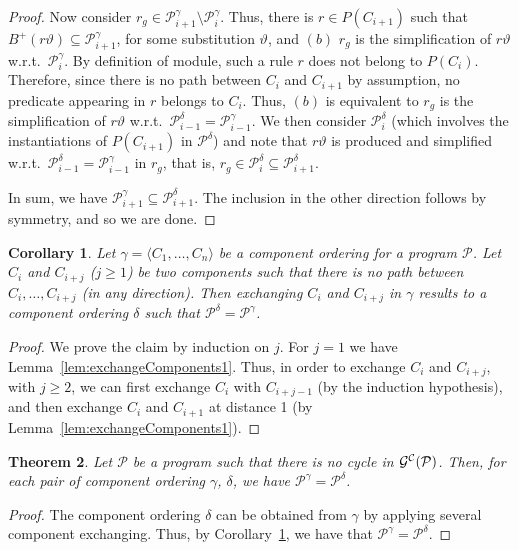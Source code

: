 \documentclass{tlp}
\newcommand{\p}{\ensuremath{{\mathcal{P}}}}
\newcommand{\intelligent}{\ensuremath{\p}}
\newcommand{\R}{\ensuremath{r}}
\newcommand{\posbody}[1]{\ensuremath{B^+(#1)}}
\newtheorem{theorem}{Theorem}[section]
\newtheorem{corollary}[theorem]{Corollary}
\begin{document}
{\begin{proof}
Now consider $\R_g \in \intelligent_{i+1}^\gamma \setminus \intelligent_{i}^\gamma$.
Thus, there is $\R \in P(C_{i+1})$ such that
$\posbody{\R\vartheta} \subseteq \intelligent_{i+1}^\gamma$, for some substitution $\vartheta$,
and $(b)$ $\R_g$ is the simplification of $\R\vartheta$ w.r.t.\ $\intelligent_{i}^\gamma$.
By definition of module, such a rule $\R$ does not belong to $P(C_i)$.
Therefore, since there is no path between $C_i$ and $C_{i+1}$ by assumption,
no predicate appearing in $\R$ belongs to $C_i$.
Thus, $(b)$ is equivalent to $\R_g$ is the simplification of $\R\vartheta$
w.r.t.\ $\intelligent_{i-1}^\delta = \intelligent_{i-1}^\gamma$.
We then consider $\intelligent_i^\delta$ (which involves the instantiations of $P(C_{i+1})$
in $\intelligent^\delta$) and note that $\R\vartheta$ is produced and simplified
w.r.t.\ $\intelligent_{i-1}^\delta = \intelligent_{i-1}^\gamma$ in $\R_g$,
that is, $\R_g \in \intelligent_{i}^\delta \subseteq \intelligent_{i+1}^\delta$.

In sum, we have $\intelligent_{i+1}^\gamma \subseteq \intelligent_{i+1}^\delta$. 
The inclusion in the other direction follows by symmetry,
and so we are done.
\end{proof}

\begin{corollary}\label{cor:exchangeComponents}
Let $\gamma = \langle C_1, \ldots, C_n \rangle$ be a component ordering for
a program $\p$.
Let $C_i$ and $C_{i+j}$ ($j \ge 1$) be two components such that there is no path between
$C_{i}, \ldots, C_{i+j}$ (in any direction).
Then exchanging $C_i$ and $C_{i+j}$ in $\gamma$ results to a component ordering
$\delta$ such that $\p^\delta = \p^\gamma$.
\end{corollary}
\begin{proof}
We prove the claim by induction on $j$.
For $j = 1$ we have Lemma~\ref{lem:exchangeComponents1}.
Thus, in order to exchange $C_i$ and $C_{i+j}$, with $j \ge 2$, we can first
exchange $C_i$ with $C_{i+j-1}$ (by the induction hypothesis), and then 
exchange $C_i$ and $C_{i+1}$ at distance 1 (by Lemma~\ref{lem:exchangeComponents1}).
\end{proof}

\begin{theorem}
Let $\p$ be a program such that there is no cycle in ${\cal G^C}(\p)$.
Then, for each pair of component ordering $\gamma$, $\delta$, 
we have $\p^\gamma = \p^\delta$.
\end{theorem}
\begin{proof}
The component ordering $\delta$ can be obtained from $\gamma$ by applying
several component exchanging. Thus, by Corollary~\ref{cor:exchangeComponents},
we have that $\p^\gamma = \p^\delta$.
\end{proof}

}
\end{document}
